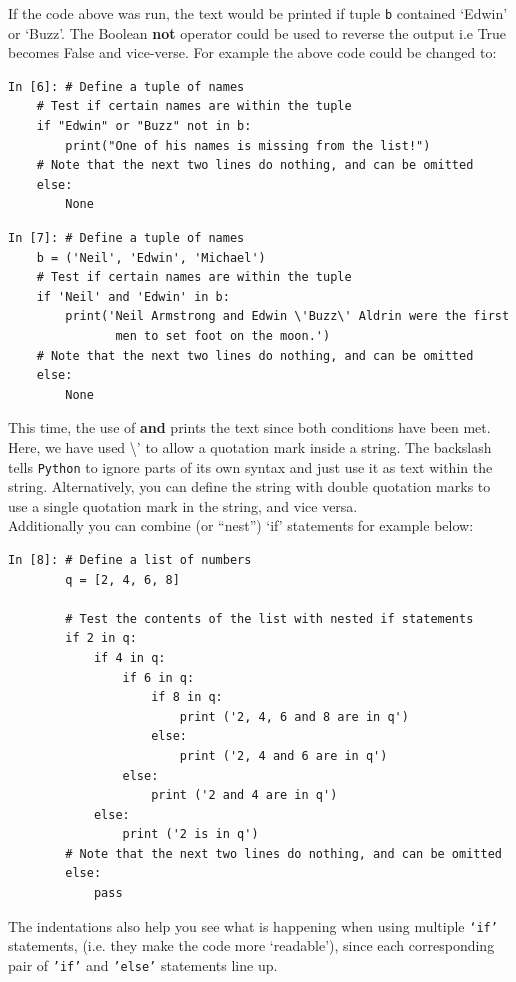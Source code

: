\noindent If the code above was run, the text would be printed if tuple {\tt b} contained `Edwin' or `Buzz'. The Boolean \textbf{\color{orange}not} operator could be used to reverse the output i.e True becomes False and vice-verse. For example the above code could be changed to:
\begin{lstlisting}[style=PY]
In [6]: # Define a tuple of names
    # Test if certain names are within the tuple
    if "Edwin" or "Buzz" not in b:
        print("One of his names is missing from the list!")
    # Note that the next two lines do nothing, and can be omitted
    else:
        None
\end{lstlisting}

\newpage
\begin{lstlisting}[style=PY]
In [7]: # Define a tuple of names
    b = ('Neil', 'Edwin', 'Michael')
    # Test if certain names are within the tuple
    if 'Neil' and 'Edwin' in b:
        print('Neil Armstrong and Edwin \'Buzz\' Aldrin were the first 
               men to set foot on the moon.')
    # Note that the next two lines do nothing, and can be omitted
    else:
        None
\end{lstlisting}
This time, the use of \textbf{\color{orange}and} prints the text since both conditions have been met. 
Here, we have used {\color{mygreen}\textbackslash'} to allow a quotation mark inside a string. The backslash tells \texttt{Python} to ignore parts of its own syntax and just use it as text within the string. Alternatively, you can define the string with double quotation marks to use a single quotation mark in the string, and vice versa. \\
\noindent Additionally you can combine (or ``nest'') `if' statements for example below:
\begin{lstlisting}[style=PY]
In [8]: # Define a list of numbers
        q = [2, 4, 6, 8]
        
        # Test the contents of the list with nested if statements
        if 2 in q:
            if 4 in q:
                if 6 in q:
                    if 8 in q:
                        print ('2, 4, 6 and 8 are in q')
                    else:
                        print ('2, 4 and 6 are in q')
                else:
                    print ('2 and 4 are in q')
            else:
                print ('2 is in q')
        # Note that the next two lines do nothing, and can be omitted
        else:
            pass
\end{lstlisting}
\noindent The indentations also help you see what is happening when using multiple \texttt{`if'} statements, (i.e. they make the code more `readable'), since each corresponding pair of \texttt{'if'} and \texttt{'else'} statements line up.

